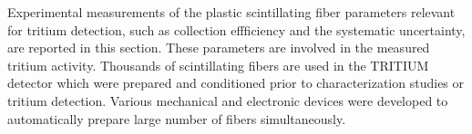 Experimental measurements of the plastic scintillating fiber parameters relevant for tritium detection, such as collection effficiency and the systematic uncertainty, are reported in this section. These parameters are involved in the measured tritium activity. Thousands of scintillating fibers are used in the TRITIUM detector which were prepared and conditioned prior to characterization studies or tritium detection. Various mechanical and electronic devices were developed to automatically prepare large number of fibers simultaneously.